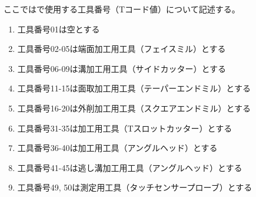 

ここでは\DMname で使用する工具番号（Tコード値）について記述する。


\begin{enumerate}[label=\Roman*), ref=\Roman*)]
\item 工具番号01は空とする
\item 工具番号02-05は端面加工用工具（フェイスミル）とする
\item 工具番号06-09は溝加工用工具（サイドカッター）とする
\item 工具番号11-15は面取加工用工具（テーパーエンドミル）とする
\item 工具番号16-20は外削加工用工具（スクエアエンドミル）とする
\item 工具番号31-35は\dimple 加工用工具（Tスロットカッター）とする
\item 工具番号36-40は\dimple 加工用工具（アングルヘッド）とする
\item 工具番号41-45は逃し溝加工用工具（アングルヘッド）とする
\item 工具番号49, 50は測定用工具（タッチセンサープローブ）とする
\end{enumerate}


